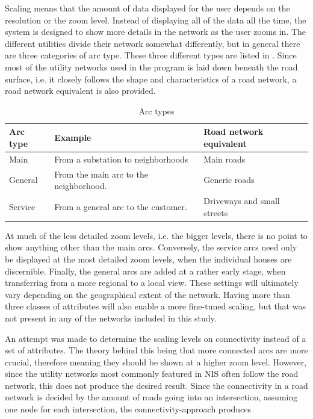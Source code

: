 \documentclass[a4paper,12pt,titlepage]{article}
\begin{document}
Scaling means that the amount of data displayed for the user depends on the resolution or the zoom level. Instead of displaying all of the data all the time, the system is designed to show more details in the network as the user zooms in. The different utilities divide their network somewhat differently, but in general there are three categories of arc type. These three different types are listed in . Since most of the utility networks used in the program is laid down beneath the road surface, i.e. it closely follows the shape and characteristics of a road network, a road network equivalent is also provided.

\begin{table} [h]
\caption {Arc types}
\centering
	\begin{tabular}{|l|l|l|}
		\hline
		\bf Arc type & \bf Example & \bf Road network equivalent\\
  		\hline 
		Main & From a substation to neighborhoods & Main roads\\
		General & From the main arc to the neighborhood. & Generic roads \\
		Service & From a general arc to the customer. & Driveways and small streets\\
		\hline
	\end{tabular}
	\label{tab:arcs}
\end{table}

At much of the less detailed zoom levels, i.e. the bigger levels, there is no point to show anything other than the main arcs. Conversely, the service arcs need only be displayed at the most detailed zoom levels, when the individual houses are discernible. Finally, the general arcs are added at a rather early stage, when transferring from a more regional to a local view. These settings will ultimately vary depending on the geographical extent of the network. Having more than three classes of attributes will also enable a more fine-tuned scaling, but that was not present in any of the networks included in this study.

An attempt was made to determine the scaling levels on connectivity instead of a set of attributes. The theory behind this being that more connected arcs are more crucial, therefore meaning they should be shown at a higher zoom level. However, since the utility networks most commonly featured in NIS often follow the road network, this does not produce the desired result. Since the connectivity in a road network is decided by the amount of roads going into an intersection, assuming one node for each intersection, the connectivity-approach produces 
\end{document}
